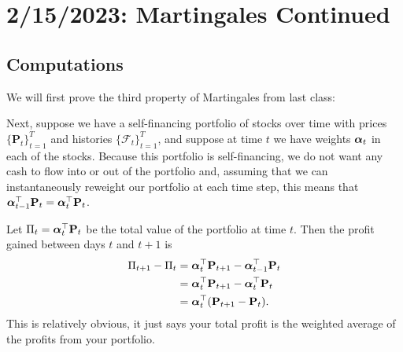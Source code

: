 \chapter{2/15/2023: Martingales Continued}
\section{Computations}
We will first prove the third property of Martingales from last class:

Next, suppose we have a self-financing portfolio of stocks over time with prices $\{\mathbf P_t\}_{t=1}^T$ and histories $\{\mathcal F_t\}_{t=1}^T$, and suppose at time $t$ we have weights $\boldsymbol{\alpha}_t$ in each of the stocks. Because this portfolio is self-financing, we do not want any cash to flow into or out of the portfolio and, assuming that we can instantaneously reweight our portfolio at each time step, this means that $\boldsymbol{\alpha}_{t-1}^\top\mathbf P_t = \boldsymbol{\alpha}_t^\top\mathbf P_t$.

Let $\Pi_t=\boldsymbol{\alpha}_t^\top\mathbf P_t$ be the total value of the portfolio at time $t$. Then the profit gained between days $t$ and $t+1$ is \begin{align*}
	\Pi_{t+1}-\Pi_t &= \boldsymbol{\alpha}_t^\top\mathbf P_{t+1} - \boldsymbol{\alpha}_{t-1}^\top\mathbf P_t \\
					&= \boldsymbol{\alpha}_t^\top\mathbf P_{t+1} - \boldsymbol{\alpha}_t^\top\mathbf P_t \\
					&= \boldsymbol{\alpha}_t^\top(\mathbf P_{t+1}-\mathbf P_t).
\end{align*} This is relatively obvious, it just says your total profit is the weighted average of the profits from your portfolio.

